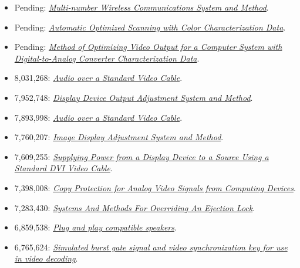 \documentclass[10pt,letterpaper,oneside]{report}
\begin{document}
\begin{itemize}
  \item Pending: \href{http://voltz.ws/resume/20070099638.pdf}{\textit{Multi-number Wireless Communications System and Method}}.

  \item Pending: \href{http://voltz.ws/resume/20030123723.pdf}{\textit{Automatic Optimized Scanning with Color Characterization Data}}.

  \item Pending: \href{http://voltz.ws/resume/20030122840.pdf}{\textit{Method of Optimizing Video Output for a Computer System with Digital-to-Analog Converter Characterization Data}}.

  \item 8,031,268: \href{http://voltz.ws/resume/8031268.pdf}{\textit{Audio over a Standard Video Cable}}.

  \item 7,952,748: \href{http://voltz.ws/resume/7952748.pdf}{\textit{Display Device Output Adjustment System and Method}}.

  \item 7,893,998: \href{http://voltz.ws/resume/7893998.pdf}{\textit{Audio over a Standard Video Cable}}.

  \item 7,760,207: \href{http://voltz.ws/resume/7760207.pdf}{\textit{Image Display Adjustment System and Method}}.

  \item 7,609,255: \href{http://voltz.ws/resume/7609255.pdf}{\textit{Supplying Power from a Display Device to a Source Using a Standard DVI Video Cable}}.

  \item 7,398,008: \href{http://voltz.ws/resume/7398008.pdf}{\textit{Copy Protection for Analog Video Signals from Computing Devices}}.

  \item 7,283,430: \href{http://voltz.ws/resume/7283430.pdf}{\textit{Systems And Methods For Overriding An Ejection Lock}}.

  \item 6,859,538: \href{http://voltz.ws/resume/6859538.pdf}{\textit{Plug and play compatible speakers}}.

  \item 6,765,624: \href{http://voltz.ws/resume/6765624.pdf}{\textit{Simulated burst gate signal and video synchronization key for use in video decoding}}.


\end{itemize}
\end{document}
